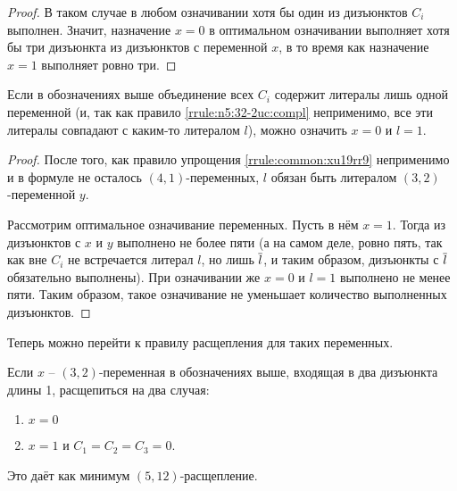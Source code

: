 \begin{proof}
 В таком случае в любом означивании хотя бы один из дизъюнктов $C_i$ выполнен. Значит, назначение $x = 0$ в оптимальном означивании выполняет хотя бы три дизъюнкта из дизъюнктов с переменной $x$, в то время как назначение $x = 1$ выполняет ровно три.
\end{proof}

\begin{rrule}
 Если в обозначениях выше объединение всех $C_i$ содержит литералы лишь одной переменной (и, так как правило \ref{rrule:n5:32-2uc:compl} неприменимо, все эти литералы совпадают с каким-то литералом $l$), можно означить $x = 0$ и $l = 1$.
 \label{rrule:n5:32-2uc:same}
\end{rrule}

\begin{proof}
 После того, как правило упрощения \ref{rrule:common:xu19rr9} неприменимо и в формуле не осталось $(4,1)$-переменных, $l$ обязан быть литералом $(3,2)$-переменной $y$.

 Рассмотрим оптимальное означивание переменных. Пусть в нём $x = 1$. Тогда из дизъюнктов с $x$ и $y$ выполнено не более пяти (а на самом деле, ровно пять, так как вне $C_i$ не встречается литерал $l$, но лишь $\overline{l}$, и таким образом, дизъюнкты с $\overline{l}$ обязательно выполнены). При означивании же $x = 0$ и $l = 1$ выполнено не менее пяти. Таким образом, такое означивание не уменьшает количество выполненных дизъюнктов.
\end{proof}

Теперь можно перейти к правилу расщепления для таких переменных.

\begin{brule}
 Если $x$ -- $(3,2)$-переменная в обозначениях выше, входящая в два дизъюнкта длины 1, расщепиться на два случая:
 \begin{enumerate}
  \item $x = 0$
  \item $x = 1$ и $C_1 = C_2 = C_3 = 0$.
 \end{enumerate}

 Это даёт как минимум $(5,12)$-расщепление.
 \label{brule:n5:32-2uc}
\end{brule}

